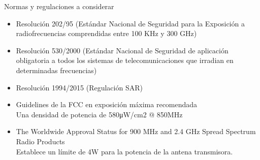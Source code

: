 Normas y regulaciones a considerar

\begin{itemize}
\item Resolución 202/95  (Estándar Nacional de Seguridad para la Exposición a radiofrecuencias comprendidas entre 100 KHz y 300 GHz)
\item Resolución 530/2000 (Estándar Nacional de Seguridad de aplicación obligatoria a todos los sistemas de telecomunicaciones que irradian en determinadas frecuencias)
\item Resolución 1994/2015 (Regulación SAR)
\item Guidelines de la FCC en exposición máxima recomendada\\
Una densidad de potencia de 580μW/cm2 @ 850MHz
\item The Worldwide Approval Status for 900 MHz and 2.4 GHz Spread Spectrum Radio Products\\
\quad Establece un límite de 4W para la potencia de la antena transmisora.

\end{itemize}









